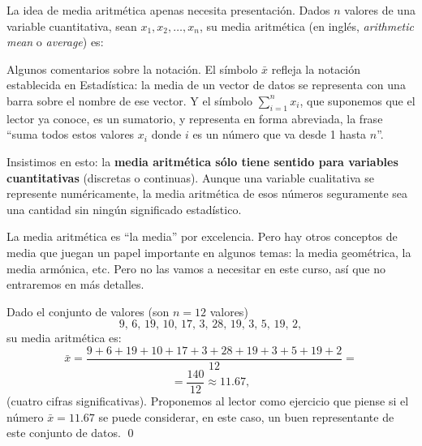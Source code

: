 La idea de media aritmética apenas necesita presentación. Dados $n$ valores de una {\sf variable
cuantitativa}, sean $x_1,x_2,\ldots,x_n$, su {\sf media aritmética}  (en
inglés, {\em arithmetic mean} o {\em average}) 
es:
    \begin{center}
    \end{center}
Algunos comentarios sobre la notación. El símbolo $\bar x$ refleja la notación establecida en Estadística: la media de un vector de datos se representa con una barra sobre el nombre de ese vector. Y el símbolo $\displaystyle\sum_{i=1}^n x_i$, que suponemos que el lector ya conoce, es un {\sf sumatorio},  y representa en forma abreviada, la frase ``suma todos estos valores $x_i$ donde $i$ es un número que va desde 1 hasta $n$''.

Insistimos en esto: la {\bf media aritmética sólo tiene sentido para variables
cuantitativas} (discretas o continuas). Aunque una variable cualitativa se
represente numéricamente, la media aritmética de esos números seguramente sea
una cantidad sin ningún significado estadístico.

La media aritmética es ``la media'' por excelencia. Pero hay otros conceptos de
media que juegan un papel importante en algunos temas: la media geométrica, la
media armónica, etc. Pero no las vamos a necesitar en este curso, así que no
entraremos en más detalles.

\begin{ejemplo}
\label{cap02:ejem:MediaAritmetica}
Dado el conjunto de valores (son $n=12$ valores)
\[9,\, 6,\, 19,\, 10,\, 17,\, 3,\, 28,\, 19,\, 3,\, 5,\, 19,\, 2,\]
su media aritmética es:
{\scriptsize
\[\bar x=\dfrac{9 + 6 + 19 + 10 + 17 + 3 + 28 + 19 + 3 + 5 + 19 + 2}{12}=\]
}
\[=\dfrac{140}{12}\approx 11.67,\]
(cuatro cifras significativas). Proponemos al lector como ejercicio que piense si el número $\bar x=11.67$ se puede considerar, en este caso, un buen representante de este conjunto de datos.
\qed
\end{ejemplo}

